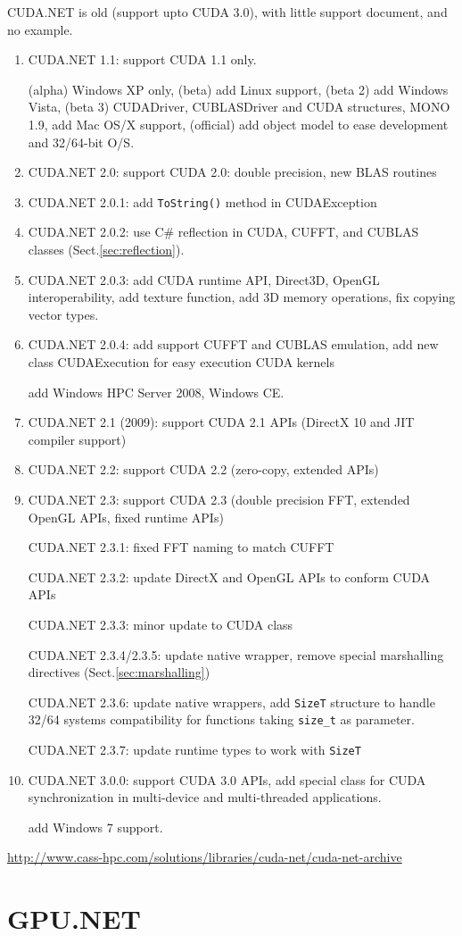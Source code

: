 CUDA.NET is old (support upto CUDA 3.0), with little support document, and no
example.
\begin{enumerate}
  \item CUDA.NET 1.1: support CUDA 1.1 only. 
  
  (alpha) Windows XP only, (beta) add Linux support, (beta 2) add Windows Vista,
  (beta 3) CUDADriver, CUBLASDriver and CUDA structures, MONO 1.9, add Mac OS/X
  support, (official) add object model to ease development and 32/64-bit O/S.
  
  \item CUDA.NET 2.0: support CUDA 2.0: double precision, new BLAS routines
  
  \item CUDA.NET 2.0.1: add \verb!ToString()! method in CUDAException
  
  \item CUDA.NET 2.0.2: use C\# reflection in CUDA, CUFFT, and CUBLAS classes
  (Sect.\ref{sec:reflection}).
  
  \item CUDA.NET 2.0.3: add CUDA runtime API, Direct3D, OpenGL interoperability,
  add texture function, add 3D memory operations, fix copying vector types.
  
  \item CUDA.NET 2.0.4: add support CUFFT and CUBLAS emulation, add new class
  CUDAExecution for easy execution CUDA kernels
  
  add Windows HPC Server 2008, Windows CE.
  
  \item CUDA.NET 2.1 (2009): support CUDA 2.1 APIs (DirectX 10 and JIT compiler
  support)
  
  \item CUDA.NET 2.2: support CUDA 2.2 (zero-copy, extended APIs)
  
  \item CUDA.NET 2.3: support CUDA 2.3 (double precision FFT, extended OpenGL
  APIs, fixed runtime APIs)
  
  CUDA.NET 2.3.1: fixed FFT naming to match CUFFT
  
  CUDA.NET 2.3.2: update DirectX and OpenGL APIs to conform CUDA APIs
  
  CUDA.NET 2.3.3: minor update to CUDA class
  
  CUDA.NET 2.3.4/2.3.5: update native wrapper, remove special marshalling
  directives (Sect.\ref{sec:marshalling})
  
  CUDA.NET 2.3.6: update native wrappers, add \verb!SizeT! structure to handle
  32/64 systems compatibility for functions taking \verb!size_t! as parameter.
  
  CUDA.NET 2.3.7: update runtime types to work with \verb!SizeT!
  
  \item CUDA.NET 3.0.0: support CUDA 3.0 APIs, add special class for CUDA
  synchronization in multi-device and multi-threaded applications.
  
  add Windows 7 support.
\end{enumerate}
 

\url{http://www.cass-hpc.com/solutions/libraries/cuda-net/cuda-net-archive}


\section{GPU.NET}
\label{sec:GPU.NET}

